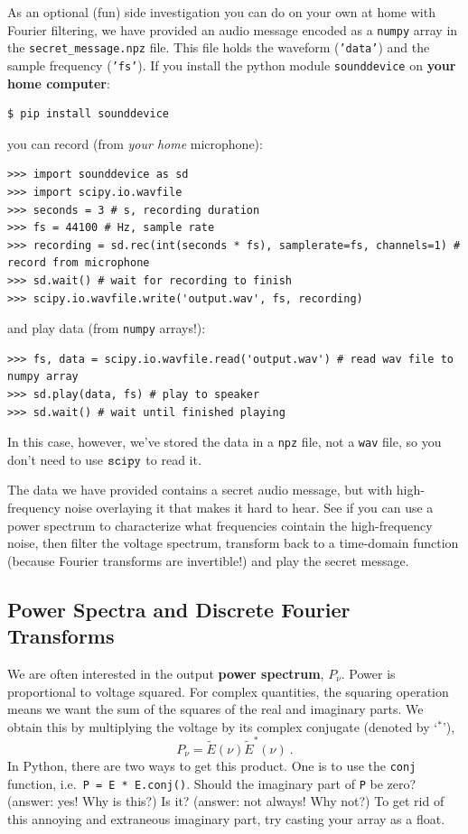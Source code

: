\documentclass[11pt,preprint]{aastex}
\begin{document}
As an optional (fun) side investigation you can do on your own at
home 
with Fourier filtering, we have provided an audio message encoded as a {\tt numpy} array in the 
{\tt secret\_message.npz} file. This file holds the waveform ({\tt 'data'}) and the sample
frequency ({\tt 'fs'}). If you install the python module {\tt sounddevice} on {\bf your home computer}:
\begin{verbatim}
$ pip install sounddevice
\end{verbatim}
you can record (from {\it your home} microphone):
\begin{verbatim}
>>> import sounddevice as sd
>>> import scipy.io.wavfile
>>> seconds = 3 # s, recording duration
>>> fs = 44100 # Hz, sample rate
>>> recording = sd.rec(int(seconds * fs), samplerate=fs, channels=1) # record from microphone
>>> sd.wait() # wait for recording to finish
>>> scipy.io.wavfile.write('output.wav', fs, recording)
\end{verbatim}
and play data (from {\tt numpy} arrays!):
\begin{verbatim}
>>> fs, data = scipy.io.wavfile.read('output.wav') # read wav file to numpy array
>>> sd.play(data, fs) # play to speaker
>>> sd.wait() # wait until finished playing
\end{verbatim}
In this case, however, we've stored the data in a {\tt npz} file, not a {\tt wav} file, so you
don't need to use $\tt scipy$ to read it.

The data we have provided contains a secret audio message, but with high-frequency noise
overlaying it that makes it hard to hear. See if you can use a power spectrum to characterize
what frequencies cointain the high-frequency noise, then filter the voltage spectrum, transform
back to a time-domain function (because Fourier transforms are invertible!) and play the secret
message.


\subsection{Power Spectra and Discrete Fourier Transforms} 
\label{pwrspect}

\noindent
We are often interested in the output {\bf power spectrum}, 
$P_\nu$.  Power is proportional to voltage squared.  For complex quantities, the squaring
operation means we want the sum of the squares of the real and imaginary
parts.  We obtain this by multiplying the voltage by its complex
conjugate (denoted by `$^*$'),
%
\begin{equation}
P_\nu = \tilde E(\nu) \tilde E^*(\nu) \ .
\end{equation}
% 
\noindent In Python, there are two ways to get this product.  One is to use
the \verb$conj$ function, i.e.\ {\tt P = E * E.conj()}.  Should the
imaginary part of \verb$P$ be zero? (answer: yes! Why is this?) Is it?
(answer: not always! Why not?) To get rid of this annoying and extraneous
imaginary part, try casting your array as a float.
 
\end{document}
